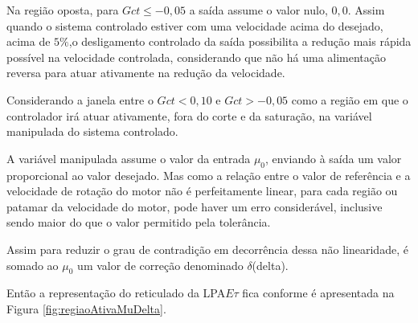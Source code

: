 Na região oposta, para $Gct \le -0,05$ a saída assume
o valor nulo, $0,0$. Assim quando o sistema controlado estiver com
uma velocidade acima do desejado, acima de $5\%$,o desligamento
controlado da saída possibilita a redução mais rápida possível na
velocidade controlada, considerando que não há uma alimentação
reversa para atuar ativamente na redução da velocidade.
 




 





Considerando a janela entre o $Gct < 0,10$ e $Gct > -0,05$ como a
região em que o controlador irá atuar ativamente, fora do corte e da
saturação, na variável manipulada do sistema controlado.

A variável manipulada assume o valor da entrada $\mu_0$,
enviando à saída um valor proporcional ao valor desejado.
Mas como a relação entre o valor de referência e a 
velocidade de rotação do motor não é perfeitamente linear,
para cada região ou patamar da velocidade do motor,
pode haver um erro considerável,
inclusive sendo maior do que o valor permitido pela 
tolerância. 

Assim para reduzir o grau de contradição
em decorrência dessa não linearidade, 
é somado ao $\mu_0$ um valor de correção denominado $\delta$(delta).

Então a representação do reticulado da LPA$E\tau$ 
fica conforme é apresentada na Figura \ref{fig:regiaoAtivaMuDelta}. 





